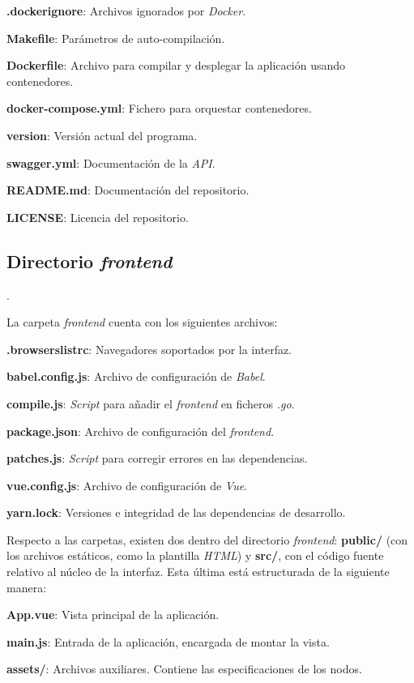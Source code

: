 \textbf{.dockerignore}: Archivos ignorados por \textit{Docker}.

\textbf{Makefile}: Parámetros de auto-compilación.

\textbf{Dockerfile}: Archivo para compilar y desplegar la aplicación usando contenedores.

\textbf{docker-compose.yml}: Fichero para orquestar contenedores.

\textbf{version}: Versión actual del programa.

\textbf{swagger.yml}: Documentación de la \textit{API}.

\textbf{README.md}: Documentación del repositorio.

\textbf{LICENSE}: Licencia del repositorio.\sn

\subsection{Directorio \textit{frontend}} \label{sub:frontenddir}.

La carpeta \textit{frontend} cuenta con los siguientes archivos:\sn

\textbf{.browserslistrc}: Navegadores soportados por la interfaz.

\textbf{babel.config.js}: Archivo de configuración de \textit{Babel}.

\textbf{compile.js}: \textit{Script} para añadir el \textit{frontend} en ficheros \textit{.go}.

\textbf{package.json}: Archivo de configuración del \textit{frontend}.

\textbf{patches.js}: \textit{Script} para corregir errores en las dependencias.

\textbf{vue.config.js}: Archivo de configuración de \textit{Vue}.

\textbf{yarn.lock}: Versiones e integridad de las dependencias de desarrollo.\sn

Respecto a las carpetas, existen dos dentro del directorio \textit{frontend}: \textbf{public/} (con los archivos estáticos, como la plantilla \textit{HTML}) y \textbf{src/}, con el código fuente relativo al núcleo de la interfaz. Esta última está estructurada de la siguiente manera:\sn

\textbf{App.vue}: Vista principal de la aplicación.

\textbf{main.js}: Entrada de la aplicación, encargada de montar la vista.

\textbf{assets/}: Archivos auxiliares. Contiene las especificaciones de los nodos.

